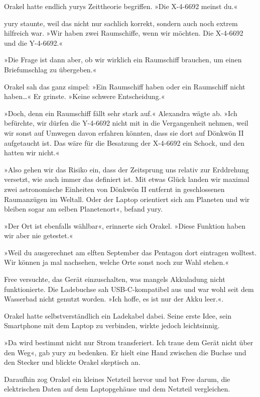 Orakel hatte endlich yurys Zeittheorie begriffen. »Die X-4-6692 meinst du.«

yury staunte, weil das nicht nur sachlich korrekt, sondern auch noch extrem hilfreich war. »Wir haben zwei Raumschiffe, wenn wir möchten. Die X-4-6692 und die Y-4-6692.«

»Die Frage ist dann aber, ob wir wirklich ein Raumschiff brauchen, um einen Briefumschlag zu übergeben.«

Orakel sah das ganz simpel: »Ein Raumschiff haben oder ein Raumschiff nicht haben…« Er grinste. »Keine schwere Entscheidung.«

»Doch, denn ein Raumschiff fällt sehr stark auf.« Alexandra wägte ab. »Ich befürchte, wir dürfen die Y-4-6692 nicht mit in die Vergangenheit nehmen, weil wir sonst auf Umwegen davon erfahren könnten, dass sie dort auf Dönkwön II aufgetaucht ist. Das wäre für die Besatzung der X-4-6692 ein Schock, und den hatten wir nicht.«

»Also gehen wir das Risiko ein, dass der Zeitsprung uns relativ zur Erddrehung versetzt, wie auch immer das definiert ist. Mit etwas Glück landen wir maximal zwei astronomische Einheiten von Dönkwön II entfernt in geschlossenen Raumanzügen im Weltall. Oder der Laptop orientiert sich am Planeten und wir bleiben sogar am selben Planetenort«, befand yury.

»Der Ort ist ebenfalls wählbar«, erinnerte sich Orakel. »Diese Funktion haben wir aber nie getestet.«

»Weil du ausgerechnet am elften September das Pentagon dort eintragen wolltest. Wir können ja mal nachsehen, welche Orte sonst noch zur Wahl stehen.«

Free versuchte, das Gerät einzuschalten, was mangels Akkuladung nicht funktionierte. Die Ladebuchse sah USB-C-kompatibel aus und war wohl seit dem Wasserbad nicht genutzt worden. »Ich hoffe, es ist nur der Akku leer.«.

Orakel hatte selbstverständlich ein Ladekabel dabei. Seine erste Idee, sein Smartphone mit dem Laptop zu verbinden, wirkte jedoch leichtsinnig.

»Da wird bestimmt nicht nur Strom transferiert. Ich traue dem Gerät nicht über den Weg«, gab yury zu bedenken. Er hielt eine Hand zwischen die Buchse und den Stecker und blickte Orakel skeptisch an.

Daraufhin zog Orakel ein kleines Netzteil hervor und bat Free darum, die elektrischen Daten auf dem Laptopgehäuse und dem Netzteil vergleichen.

